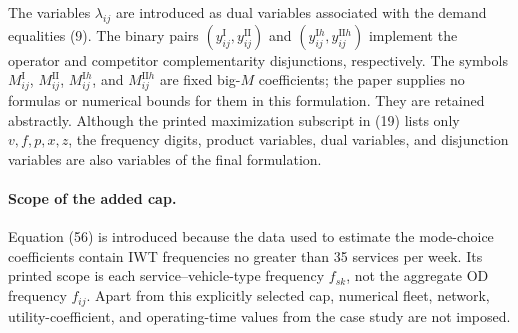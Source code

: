 \documentclass{article}
\begin{document}
The variables \(\lambda_{ij}\) are introduced as dual variables associated with the demand equalities (9). The binary pairs \((y_{ij}^{\mathrm I},y_{ij}^{\mathrm{II}})\) and \((y_{ij}^{\mathrm I h},y_{ij}^{\mathrm{II}h})\) implement the operator and competitor complementarity disjunctions, respectively. The symbols \(M_{ij}^{\mathrm I}\), \(M_{ij}^{\mathrm{II}}\), \(M_{ij}^{\mathrm I h}\), and \(M_{ij}^{\mathrm{II}h}\) are fixed big-\(M\) coefficients; the paper supplies no formulas or numerical bounds for them in this formulation. They are retained abstractly. Although the printed maximization subscript in (19) lists only \(v,f,p,x,z\), the frequency digits, product variables, dual variables, and disjunction variables are also variables of the final formulation.

\paragraph{Scope of the added cap.}
Equation (56) is introduced because the data used to estimate the mode-choice coefficients contain IWT frequencies no greater than 35 services per week. Its printed scope is each service--vehicle-type frequency \(f_{sk}\), not the aggregate OD frequency \(f_{ij}\). Apart from this explicitly selected cap, numerical fleet, network, utility-coefficient, and operating-time values from the case study are not imposed.
\end{document}
